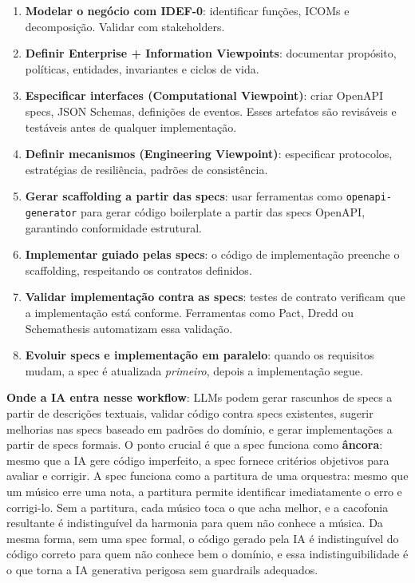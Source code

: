 \begin{enumerate}
    \item \textbf{Modelar o negócio com IDEF-0}: identificar funções, ICOMs e
    decomposição. Validar com stakeholders.

    \item \textbf{Definir Enterprise + Information Viewpoints}: documentar
    propósito, políticas, entidades, invariantes e ciclos de vida.

    \item \textbf{Especificar interfaces (Computational Viewpoint)}: criar
    OpenAPI specs, JSON Schemas, definições de eventos. Esses artefatos são
    revisáveis e testáveis antes de qualquer implementação.

    \item \textbf{Definir mecanismos (Engineering Viewpoint)}: especificar
    protocolos, estratégias de resiliência, padrões de consistência.

    \item \textbf{Gerar scaffolding a partir das specs}: usar ferramentas como
    \texttt{openapi-generator} para gerar código boilerplate a partir das specs
    OpenAPI, garantindo conformidade estrutural.

    \item \textbf{Implementar guiado pelas specs}: o código de implementação
    preenche o scaffolding, respeitando os contratos definidos.

    \item \textbf{Validar implementação contra as specs}: testes de contrato
    verificam que a implementação está conforme. Ferramentas como Pact, Dredd
    ou Schemathesis automatizam essa validação.

    \item \textbf{Evoluir specs e implementação em paralelo}: quando os
    requisitos mudam, a spec é atualizada \emph{primeiro}, depois a
    implementação segue.
\end{enumerate}

\textbf{Onde a IA entra nesse workflow}: LLMs podem gerar rascunhos de specs a
partir de descrições textuais, validar código contra specs existentes, sugerir
melhorias nas specs baseado em padrões do domínio, e gerar implementações a
partir de specs formais. O ponto crucial é que a spec funciona como
\textbf{âncora}: mesmo que a IA gere código imperfeito, a spec fornece
critérios objetivos para avaliar e corrigir. A spec funciona como a partitura de
uma orquestra: mesmo que um músico erre uma nota, a partitura permite identificar
imediatamente o erro e corrigi-lo. Sem a partitura, cada músico toca o que acha
melhor, e a cacofonia resultante é indistinguível da harmonia para quem não
conhece a música. Da mesma forma, sem uma spec formal, o código gerado pela IA
é indistinguível do código correto para quem não conhece bem o domínio,
e essa indistinguibilidade é o que torna a IA generativa perigosa
sem guardrails adequados.


